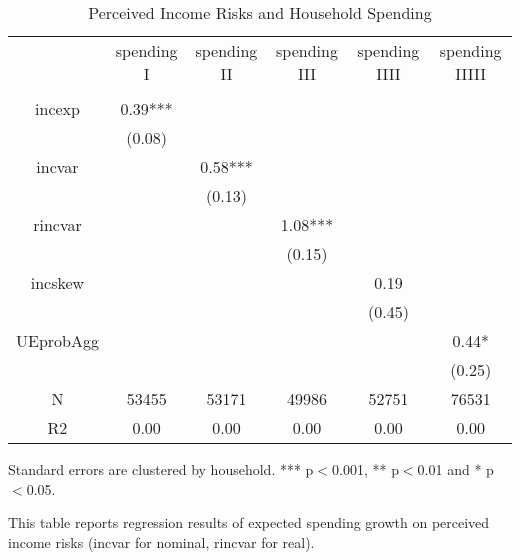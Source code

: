 \begin{table}[p]
\centering
\begin{adjustbox}{width={0.9\textwidth}}
\begin{threeparttable}
\caption{Perceived Income Risks and Household Spending}
\label{spending_reg}\begin{tabular}{cccccc}
\toprule
{} & spending I & spending II & spending III & spending IIII & spending IIIII \\
          &            &             &              &               &                \\
\midrule
incexp    &    0.39*** &             &              &               &                \\
          &     (0.08) &             &              &               &                \\
incvar    &            &     0.58*** &              &               &                \\
          &            &      (0.13) &              &               &                \\
rincvar   &            &             &      1.08*** &               &                \\
          &            &             &       (0.15) &               &                \\
incskew   &            &             &              &          0.19 &                \\
          &            &             &              &        (0.45) &                \\
UEprobAgg &            &             &              &               &          0.44* \\
          &            &             &              &               &         (0.25) \\
N         &      53455 &       53171 &        49986 &         52751 &          76531 \\
R2        &       0.00 &        0.00 &         0.00 &          0.00 &           0.00 \\
\bottomrule
\end{tabular}
\begin{tablenotes}\item Standard errors are clustered by household. *** p$<$0.001, ** p$<$0.01 and * p$<$0.05. 
\item This table reports regression results of expected spending growth on perceived income risks (incvar for nominal, rincvar for real).
\end{tablenotes}
\end{threeparttable}
\end{adjustbox}
\end{table}